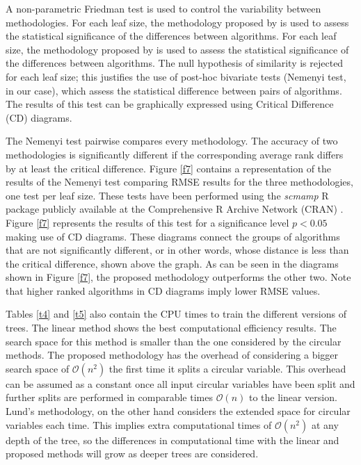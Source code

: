 \documentclass[times,twocolumn,final,authoryear]{elsarticle}
\begin{document}
A non-parametric Friedman test is used to control the variability between methodologies. For each leaf size, the methodology proposed by \citep{Demsar2006} is used to assess the statistical significance of the differences between algorithms. For each leaf size, the methodology proposed by \citep{Demsar2006} is used to assess the statistical significance of the differences between algorithms. The null hypothesis of similarity is rejected for each leaf size; this justifies the use of post-hoc bivariate tests (Nemenyi test, in our case), which assess the statistical difference between pairs of algorithms. The results of this test can be graphically expressed using Critical Difference (CD) diagrams.

The Nemenyi test pairwise compares every methodology. The accuracy of two methodologies is significantly different if the corresponding average rank differs by at least the critical difference. Figure \ref{f7} contains a representation of the results of the Nemenyi test comparing RMSE results for the three methodologies, one test per leaf size. These tests have been performed using the \textit{scmamp} R package publicly available at the Comprehensive R Archive Network (CRAN) \citep{Calvo2015}. Figure \ref{f7} represents the results of this test for a significance level $ p < 0.05 $ making use of CD diagrams.  These diagrams connect the groups of algorithms that are not significantly different, or in other words, whose distance is less than the critical difference, shown above the graph. As can be seen in the diagrams shown in Figure \ref{f7}, the proposed methodology outperforms the other two. Note that higher ranked algorithms in CD diagrams imply lower RMSE values.

Tables \ref{t4} and \ref{t5} also contain the CPU times to train the different versions of trees. The linear method shows the best computational efficiency results. The search space for this method is smaller than the one considered by the circular methods. The proposed methodology has the overhead of considering a bigger search space of $\mathcal{O}(n^2)$ the first time it splits a circular variable. This overhead can be assumed as a constant once all input circular variables have been split and further splits are performed in comparable times $\mathcal{O}(n)$ to the linear version. Lund's methodology, on the other hand considers the extended space for circular variables each time. This implies extra computational times of $\mathcal{O}(n^2)$ at any depth of the tree, so the differences in computational time with the linear and proposed methods will grow as deeper trees are considered.
\end{document}
